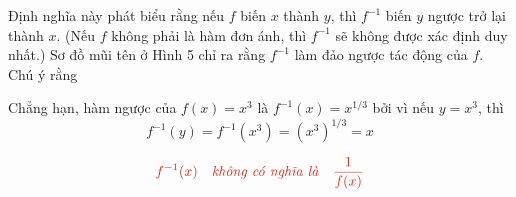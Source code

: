 \begin{minipage}[t]{0.708\textwidth}
    \vspace{0.6em}
    Định nghĩa này phát biểu rằng nếu $f$ biến $x$ thành $y$, thì $f^{-1}$ biến $y$ ngược trở lại thành $x$. (Nếu $f$ không phải là hàm đơn ánh, thì $f^{-1}$ sẽ không được xác định duy nhất.) Sơ đồ mũi tên ở Hình 5 chỉ ra rằng $f^{-1}$ làm đảo ngược tác động của $f$. Chú ý rằng

    \vspace{0.5em}
    \begin{center}
    {\color{stewartred}\setlength{\fboxrule}{0.6pt}}
    \end{center}

    \vspace{0.5em}
    Chẳng hạn, hàm ngược của $f(x) = x^3$ là $f^{-1}(x) = x^{1/3}$ bởi vì nếu $y = x^3$, thì
    \[
    f^{-1}(y) = f^{-1}(x^3) = (x^3)^{1/3} = x
    \]

    \vspace{0.4em}
    \[
    {\color{stewartred}f^{-1}(x) \quad \text{\textit{không có nghĩa là}} \quad \frac{1}{f(x)}}
    \]
\end{minipage}